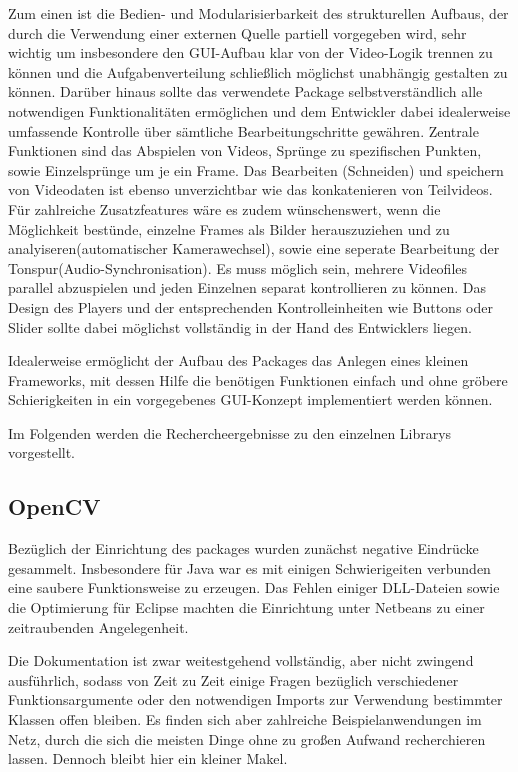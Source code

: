 Zum einen ist die Bedien- und Modularisierbarkeit des strukturellen Aufbaus, der durch die Verwendung einer externen Quelle partiell vorgegeben wird, sehr wichtig um insbesondere den GUI-Aufbau klar von der Video-Logik trennen zu können und die Aufgabenverteilung schließlich möglichst unabhängig gestalten zu können. Darüber hinaus sollte das verwendete Package selbstverständlich alle notwendigen Funktionalitäten ermöglichen und dem Entwickler dabei idealerweise umfassende Kontrolle über sämtliche Bearbeitungschritte gewähren. Zentrale Funktionen sind das Abspielen von Videos, Sprünge zu spezifischen Punkten, sowie Einzelsprünge um je ein Frame. Das Bearbeiten (Schneiden) und speichern von Videodaten ist ebenso unverzichtbar wie das konkatenieren von Teilvideos. Für zahlreiche Zusatzfeatures wäre es zudem wünschenswert, wenn die Möglichkeit bestünde, einzelne Frames als Bilder herauszuziehen und zu analyiseren(automatischer Kamerawechsel), sowie eine seperate Bearbeitung der  Tonspur(Audio-Synchronisation). Es muss möglich sein, mehrere Videofiles parallel abzuspielen und jeden Einzelnen separat kontrollieren zu können. Das Design des Players und der entsprechenden Kontrolleinheiten wie Buttons oder Slider sollte dabei möglichst vollständig in der Hand des Entwicklers liegen.

Idealerweise ermöglicht der Aufbau des Packages das Anlegen eines kleinen Frameworks, mit dessen Hilfe die benötigen Funktionen einfach und ohne gröbere Schierigkeiten in ein vorgegebenes GUI-Konzept implementiert werden können.

Im Folgenden werden die Rechercheergebnisse zu den einzelnen Librarys vorgestellt.

\subsection{OpenCV}
Bezüglich der Einrichtung des packages wurden zunächst negative Eindrücke gesammelt. Insbesondere für Java war es mit einigen Schwierigeiten verbunden eine saubere Funktionsweise zu erzeugen. Das Fehlen einiger DLL-Dateien sowie die Optimierung für Eclipse machten die Einrichtung unter Netbeans zu einer zeitraubenden Angelegenheit.

Die Dokumentation ist zwar weitestgehend vollständig, aber nicht zwingend ausführlich, sodass von Zeit zu Zeit einige Fragen bezüglich verschiedener Funktionsargumente oder den notwendigen Imports zur Verwendung bestimmter Klassen offen bleiben.  Es finden sich aber zahlreiche Beispielanwendungen im Netz, durch die sich die meisten Dinge ohne zu großen Aufwand recherchieren lassen. Dennoch bleibt hier ein kleiner Makel.

